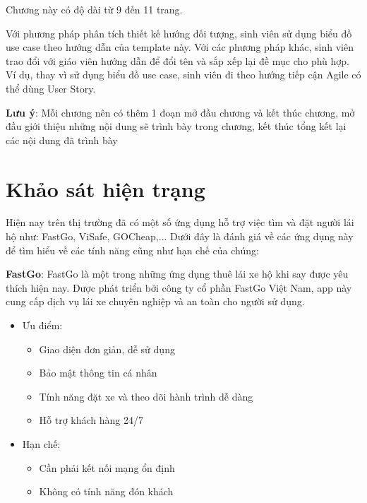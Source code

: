\documentclass[../DoAn.tex]{subfiles}
\begin{document}
Chương này có độ dài từ 9 đến 11 trang.

Với phương pháp phân tích thiết kế hướng đối tượng, sinh viên sử dụng biểu đồ use case theo hướng dẫn của template này. Với các phương pháp khác, sinh viên trao đổi với giáo viên hướng dẫn để đổi tên và sắp xếp lại đề mục cho phù hợp. Ví dụ, thay vì sử dụng biểu đồ use case, sinh viên đi theo hướng tiếp cận Agile có thể dùng User Story.


\textbf{Lưu ý}: Mỗi chương nên có thêm 1 đoạn mở đầu chương và kết thúc chương, mở đầu giới thiệu những nội dung sẽ trình bày trong chương, kết thúc tổng kết lại các nội dung đã trình bày

\section{Khảo sát hiện trạng}
\label{section:2.1}

Hiện nay trên thị trường đã có một số ứng dụng hỗ trợ việc tìm và đặt người lái hộ như: FastGo, ViSafe, GOCheap,...
Dưới đây là đánh giá về các ứng dụng này để tìm hiểu về các tính năng cũng như hạn chế của chúng:

\textbf{FastGo}: FastGo là một trong những ứng dụng thuê lái xe hộ khi say được yêu thích hiện nay. 
Được phát triển bởi công ty cổ phần FastGo Việt Nam, app này cung cấp dịch vụ lái xe chuyên nghiệp và an toàn cho người sử dụng.
\begin{itemize}
    \item Ưu điểm:
      \begin{itemize}
        \item Giao diện đơn giản, dễ sử dụng
        \item Bảo mật thông tin cá nhân
        \item Tính năng đặt xe và theo dõi hành trình dễ dàng
        \item Hỗ trợ khách hàng 24/7
      \end{itemize}
    \item Hạn chế:
      \begin{itemize}
        \item Cần phải kết nối mạng ổn định
        \item Không có tính năng đón khách
      \end{itemize}
\end{itemize}
\end{document}
